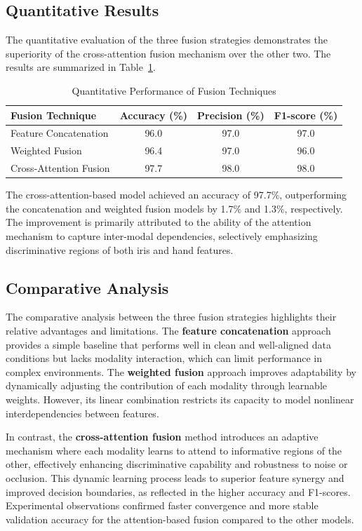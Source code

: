 \documentclass[12pt,a4paper]{report}
\begin{document}
\subsection{Quantitative Results}

The quantitative evaluation of the three fusion strategies demonstrates the superiority of the cross-attention fusion mechanism over the other two. The results are summarized in Table~\ref{tab:quant_results}.

\begin{table}[h]
\centering
\caption{Quantitative Performance of Fusion Techniques}
\label{tab:quant_results}
\begin{tabular}{|p{3.5cm}|c|c|c|}
\hline
\textbf{Fusion Technique} & \textbf{Accuracy (\%)} & \textbf{Precision (\%)} & \textbf{F1-score (\%)} \\ 
\hline
Feature Concatenation & 96.0 & 97.0 & 97.0 \\ 
\hline
Weighted Fusion & 96.4 & 97.0 & 96.0 \\ 
\hline
Cross-Attention Fusion & 97.7 & 98.0 & 98.0 \\ 
\hline
\end{tabular}
\end{table}

The cross-attention-based model achieved an accuracy of 97.7\%, outperforming the concatenation and weighted fusion models by 1.7\% and 1.3\%, respectively. The improvement is primarily attributed to the ability of the attention mechanism to capture inter-modal dependencies, selectively emphasizing discriminative regions of both iris and hand features.

\subsection{Comparative Analysis}

The comparative analysis between the three fusion strategies highlights their relative advantages and limitations. The \textbf{feature concatenation} approach provides a simple baseline that performs well in clean and well-aligned data conditions but lacks modality interaction, which can limit performance in complex environments. The \textbf{weighted fusion} approach improves adaptability by dynamically adjusting the contribution of each modality through learnable weights. However, its linear combination restricts its capacity to model nonlinear interdependencies between features.

In contrast, the \textbf{cross-attention fusion} method introduces an adaptive mechanism where each modality learns to attend to informative regions of the other, effectively enhancing discriminative capability and robustness to noise or occlusion. This dynamic learning process leads to superior feature synergy and improved decision boundaries, as reflected in the higher accuracy and F1-scores. Experimental observations confirmed faster convergence and more stable validation accuracy for the attention-based fusion compared to the other models.
\end{document}
